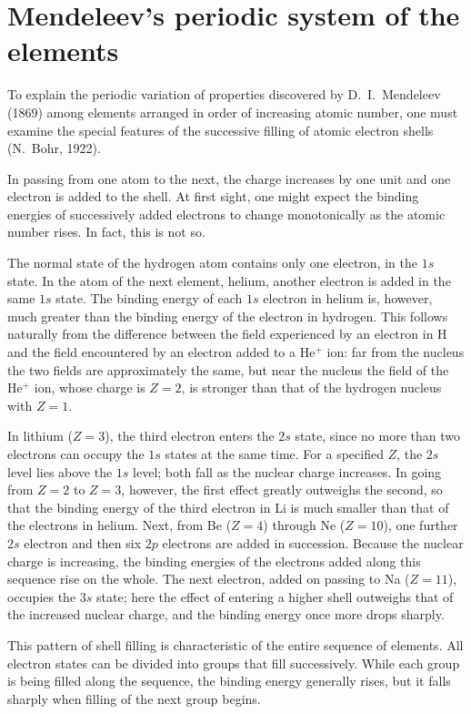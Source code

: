 \section{Mendeleev's periodic system of the elements}

To explain the periodic variation of properties discovered by D.~I.~Mendeleev (1869) among elements arranged in order of increasing atomic number, one must examine the special features of the successive filling of atomic electron shells (N.~Bohr, 1922).

In passing from one atom to the next, the charge increases by one unit and one electron is added to the shell. At first sight, one might expect the binding energies of successively added electrons to change monotonically as the atomic number rises. In fact, this is not so.

The normal state of the hydrogen atom contains only one electron, in the $1s$ state. In the atom of the next element, helium, another electron is added in the same $1s$ state. The binding energy of each $1s$ electron in helium is, however, much greater than the binding energy of the electron in hydrogen. This follows naturally from the difference between the field experienced by an electron in H and the field encountered by an electron added to a He$^+$ ion: far from the nucleus the two fields are approximately the same, but near the nucleus the field of the He$^+$ ion, whose charge is $Z=2$, is stronger than that of the hydrogen nucleus with $Z=1$.

In lithium ($Z=3$), the third electron enters the $2s$ state, since no more than two electrons can occupy the $1s$ states at the same time. For a specified $Z$, the $2s$ level lies above the $1s$ level; both fall as the nuclear charge increases. In going from $Z=2$ to $Z=3$, however, the first effect greatly outweighs the second, so that the binding energy of the third electron in Li is much smaller than that of the electrons in helium. Next, from Be ($Z=4$) through Ne ($Z=10$), one further $2s$ electron and then six $2p$ electrons are added in succession. Because the nuclear charge is increasing, the binding energies of the electrons added along this sequence rise on the whole. The next electron, added on passing to Na ($Z=11$), occupies the $3s$ state; here the effect of entering a higher shell outweighs that of the increased nuclear charge, and the binding energy once more drops sharply.

This pattern of shell filling is characteristic of the entire sequence of elements. All electron states can be divided into groups that fill successively. While each group is being filled along the sequence, the binding energy generally rises, but it falls sharply when filling of the next group begins.


